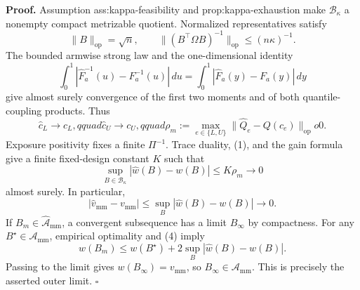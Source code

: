 \textbf{Proof.}
Assumption ass:kappa-feasibility and prop:kappa-exhaustion make \(\mathcal B_\kappa\) a nonempty compact metrizable quotient.  Normalized representatives satisfy
\[
 \lVert B\rVert_{\mathrm{op}}=\sqrt n,
 \qquad \lVert(B^{\top}\Omega B)^{-1}\rVert_{\mathrm{op}}
 \le(n\kappa)^{-1}.
\tag{1}
\]
The bounded armwise strong law and the one-dimensional identity
\[
 \int_0^1|\widehat F_a^{-1}(u)-F_a^{-1}(u)|\,du
 =\int_0^1|\widehat F_a(y)-F_a(y)|\,dy
\tag{2}
\]
give almost surely convergence of the first two moments and of both quantile-coupling products.  Thus
\[
 \widehat c_L\to c_L,qquad \widehat c_U\to c_U,qquad
 \rho_m:=\max_{e\in\{L,U\}}\lVert\widehat Q_e-Q(c_e)\rVert_{\mathrm{op}}  o0.
\tag{3}
\]
Exposure positivity fixes a finite \(\Pi^{-1}\).  Trace duality, (1), and the gain formula give a finite fixed-design constant \(K\) such that
\[
 \sup_{B\in\mathcal B_\kappa}|\widehat w(B)-w(B)|\le K\rho_m\to0
\tag{4}
\]
almost surely.  In particular,
\[
 |\widehat v_{\mathrm{mm}}-v_{\mathrm{mm}}|
 \le\sup_B|\widehat w(B)-w(B)|\to0.
\tag{5}
\]
If \(B_m\in\widehat{\mathcal A}_{\mathrm{mm}}\), a convergent subsequence has a limit \(B_\infty\) by compactness.  For any \(B^\star\in\mathcal A_{\mathrm{mm}}\), empirical optimality and (4) imply
\[
 w(B_m)\le w(B^\star)+2\sup_B|\widehat w(B)-w(B)|.
\]
Passing to the limit gives \(w(B_\infty)=v_{\mathrm{mm}}\), so \(B_\infty\in\mathcal A_{\mathrm{mm}}\).  This is precisely the asserted outer limit. \(\square\)